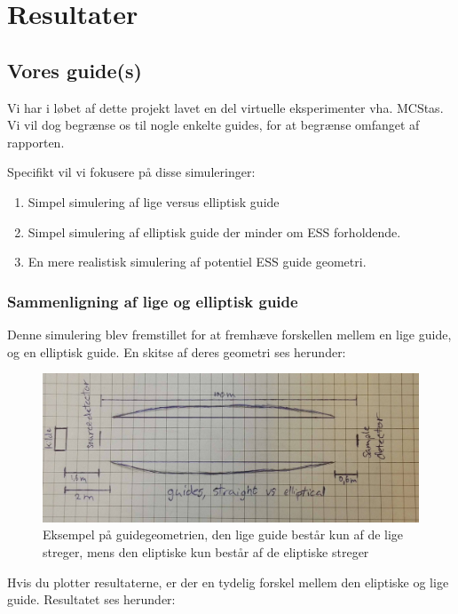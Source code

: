 \documentclass[12pt,oneside,a4paper]{article}
\begin{document}
{{{{{\section{Resultater}

\subsection{Vores guide(s)}
Vi har i løbet af dette projekt lavet en del virtuelle eksperimenter vha. MCStas. Vi vil dog begrænse os til nogle enkelte guides, for at begrænse omfanget af rapporten.

Specifikt vil vi fokusere på disse simuleringer:
\begin{enumerate}
    \item Simpel simulering af lige versus elliptisk guide \cite{github:st_vs_el}
    \item Simpel simulering af elliptisk guide der minder om ESS forholdende. \cite{github:ess_sim_simple}
    \item En mere realistisk simulering af potentiel ESS guide geometri. \cite{github:ess_brill_optimized}
\end{enumerate}

\subsubsection{Sammenligning af lige og elliptisk guide}
Denne simulering blev fremstillet for at fremhæve forskellen mellem en lige guide, og en elliptisk guide. En skitse af deres geometri ses herunder:

\begin{figure}[H]
\centering
\includegraphics[width=1\textwidth]{ElipsStraight.JPG}
\caption{Eksempel på guidegeometrien, den lige guide består kun af de lige streger, mens den eliptiske kun består af de eliptiske streger}
\end{figure}

Hvis du plotter resultaterne, er der en tydelig forskel mellem den eliptiske og lige guide. Resultatet ses herunder:

}}}}}
\end{document}
